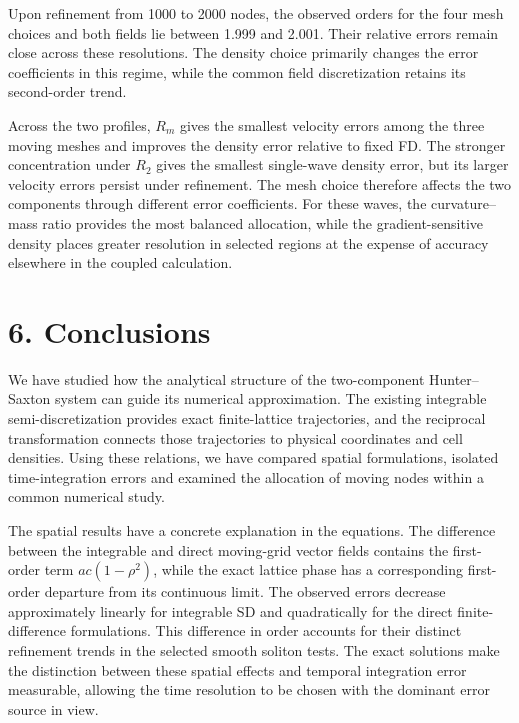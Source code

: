 \documentclass[11pt,a4paper]{article}
\begin{document}
Upon refinement from 1000 to 2000 nodes, the observed orders for the four mesh choices and both fields lie between 1.999 and 2.001. Their relative errors remain close across these resolutions. The density choice primarily changes the error coefficients in this regime, while the common field discretization retains its second-order trend.

Across the two profiles, \(R_m\) gives the smallest velocity errors among the three moving meshes and improves the density error relative to fixed FD. The stronger concentration under \(R_2\) gives the smallest single-wave density error, but its larger velocity errors persist under refinement. The mesh choice therefore affects the two components through different error coefficients. For these waves, the curvature--mass ratio provides the most balanced allocation, while the gradient-sensitive density places greater resolution in selected regions at the expense of accuracy elsewhere in the coupled calculation.

\FloatBarrier
\section*{6. Conclusions}

We have studied how the analytical structure of the two-component Hunter–Saxton system can guide its numerical approximation. The existing integrable semi-discretization provides exact finite-lattice trajectories, and the reciprocal transformation connects those trajectories to physical coordinates and cell densities. Using these relations, we have compared spatial formulations, isolated time-integration errors and examined the allocation of moving nodes within a common numerical study.

The spatial results have a concrete explanation in the equations. The difference between the integrable and direct moving-grid vector fields contains the first-order term \(ac(1-\rho^2)\), while the exact lattice phase has a corresponding first-order departure from its continuous limit. The observed errors decrease approximately linearly for integrable SD and quadratically for the direct finite-difference formulations. This difference in order accounts for their distinct refinement trends in the selected smooth soliton tests. The exact solutions make the distinction between these spatial effects and temporal integration error measurable, allowing the time resolution to be chosen with the dominant error source in view.
\end{document}
